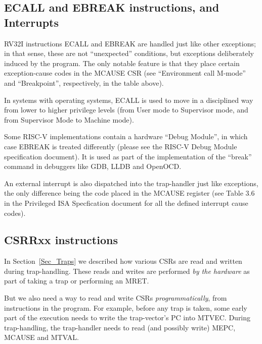 
\subsection{ECALL and EBREAK instructions, and Interrupts}

\label{Sec_ECALL_EBREAK}

RV32I instructions ECALL and EBREAK are handled just like other
exceptions; in that sense, these are not ``unexpected'' conditions,
but exceptions deliberately induced by the program.  The only notable
feature is that they place certain exception-cause codes in the MCAUSE
CSR (see ``Environment call M-mode'' and ``Breakpoint'', respectively,
in the table above).

In systems with operating systems, ECALL is used to move in a
disciplined way from lower to higher privilege levels (from User mode
to Supervisor mode, and from Supervisor Mode to Machine mode).

Some RISC-V implementations contain a hardware ``Debug Module'', in
which case EBREAK is treated differently (please see the RISC-V Debug
Module specification document).  It is used as part of the
implementation of the ``break'' command in debuggers like GDB, LLDB
and OpenOCD.

An external interrupt is also dispatched into the trap-handler just
like exceptions, the only difference being the code placed in the
MCAUSE register (see Table 3.6 in the Privileged ISA Specfication
document for all the defined interrupt cause codes).


\subsection{CSRRxx instructions}

\label{sec_CSRRxx}

In Section~\ref{Sec_Traps} we described how various CSRs are read and
written during trap-handling.  These reads and writes are performed
\emph{by the hardware} as part of taking a trap or performing an MRET.

But we also need a way to read and write CSRs \emph{programmatically},
{\ie} from instructions in the program.  For example, before any trap
is taken, some early part of the execution needs to write the
trap-vector's PC into MTVEC.  During trap-handling, the trap-handler
needs to read (and possibly write) MEPC, MCAUSE and MTVAL.


